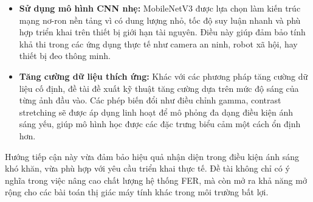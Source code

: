 \begin{itemize}
    \item \textbf{Sử dụng mô hình CNN nhẹ:} MobileNetV3 được lựa chọn làm kiến trúc mạng nơ-ron nền tảng vì có dung lượng nhỏ, tốc độ suy luận nhanh và phù hợp triển khai trên thiết bị giới hạn tài nguyên. Điều này giúp đảm bảo tính khả thi trong các ứng dụng thực tế như camera an ninh, robot xã hội, hay thiết bị đeo thông minh.
    
    \item \textbf{Tăng cường dữ liệu thích ứng:} Khác với các phương pháp tăng cường dữ liệu cố định, đề tài đề xuất kỹ thuật tăng cường dựa trên mức độ sáng của từng ảnh đầu vào. Các phép biến đổi như điều chỉnh gamma, contrast stretching sẽ được áp dụng linh hoạt để mô phỏng đa dạng điều kiện ánh sáng yếu, giúp mô hình học được các đặc trưng biểu cảm một cách ổn định hơn.
\end{itemize}

Hướng tiếp cận này vừa đảm bảo hiệu quả nhận diện trong điều kiện ánh sáng khó khăn, vừa phù hợp với yêu cầu triển khai thực tế. Đề tài không chỉ có ý nghĩa trong việc nâng cao chất lượng hệ thống FER, mà còn mở ra khả năng mở rộng cho các bài toán thị giác máy tính khác trong môi trường bất lợi.